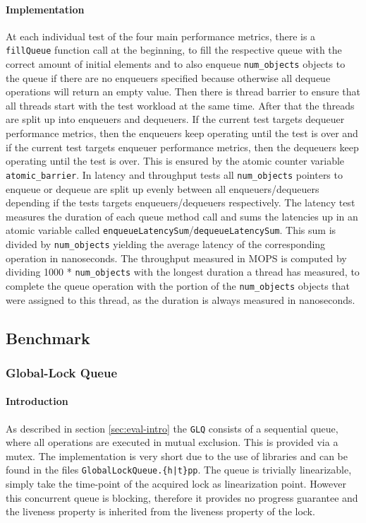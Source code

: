 \documentclass{article}
\newcommand{\GLQ}{\texttt{GLQ}}
\begin{document}
\paragraph{Implementation}
At each individual test of the four main performance metrics, there is a \texttt{fillQueue} function call at the beginning, to fill the respective queue with the correct amount of initial elements and to also enqueue \texttt{num\_objects} objects to the queue if there are no enqueuers specified because otherwise all dequeue operations will return an empty value. Then there is thread barrier to ensure that all threads start with the test workload at the same time. After that the threads are split up into enqueuers and dequeuers. If the current test targets dequeuer performance metrics, then the enqueuers keep operating until the test is over and if the current test targets enqueuer performance metrics, then the dequeuers keep operating until the test is over. This is ensured by the atomic counter variable \texttt{atomic\_barrier}. In latency and throughput tests all \texttt{num\_objects} pointers to enqueue or dequeue are split up evenly between all enqueuers/dequeuers depending if the tests targets enqueuers/dequeuers respectively. The latency test measures the duration of each queue method call and sums the latencies up in an atomic variable called \texttt{enqueueLatencySum}/\texttt{dequeueLatencySum}. This sum is divided by \texttt{num\_objects} yielding the average latency of the corresponding operation in nanoseconds. The throughput measured in MOPS is computed by dividing 1000 * \texttt{num\_objects} with the longest duration a thread has measured, to complete the queue operation with the portion of the \texttt{num\_objects} objects that were assigned to this thread, as the duration is always measured in nanoseconds. 
\clearpage
\subsection{Benchmark\label{sec:eval-benchmark}}
\subsubsection{Global-Lock Queue\label{sec:eval-benchmark-glq}}
\paragraph{Introduction}
As described in section \ref{sec:eval-intro} the \GLQ{} consists of a sequential queue, where all operations are executed in mutual exclusion. This is provided via a mutex. The implementation is very short due to the use of libraries and can be found in the files \texttt{GlobalLockQueue.\{h|t\}pp}. The queue is trivially linearizable, simply take the time-point of the acquired lock as linearization point. However this concurrent queue is blocking, therefore it provides no progress guarantee and the liveness property is inherited from the liveness property of the lock.
\end{document}
